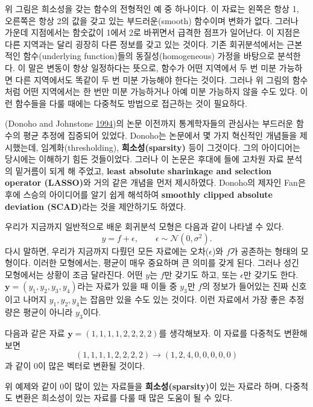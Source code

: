 \documentclass[b5paper,]{book}
\theoremstyle{definition}
\theoremstyle{definition}
\theoremstyle{definition}
\theoremstyle{remark}
\let\BeginKnitrBlock\begin \let\EndKnitrBlock\end
\begin{document}
위 그림은 희소성을 갖는 함수의 전형적인 예 중 하나이다. 이 자료는 왼쪽은
항상 1, 오른쪽은 항상 2의 값을 갖고 있는 부드러운(smooth) 함수이며
변화가 없다. 그러나 가운데 지점에서는 함숫값이 1에서 2로 바뀌면서 급격한
점프가 일어난다. 이 지점은 다른 지역과는 달리 굉장히 다른 정보를 갖고
있는 것이다. 기존 회귀분석에서는 근본적인 함수(underlying function)들의
동질성(homogeneous) 가정을 바탕으로 분석한다. 이 말은 변동이 항상
일정하다는 뜻으로, 함수가 어떤 지역에서 두 번 미분 가능하면 다른
지역에서도 똑같이 두 번 미분 가능해야 한다는 것이다. 그러나 위 그림의
함수처럼 어떤 지역에서는 한 번만 미분 가능하거나 아예 미분 가능하지 않을
수도 있다. 이런 함수들을 다룰 때에는 다중척도 방법으로 접근하는 것이
필요하다.

(Donoho and Johnstone \protect\hyperlink{ref-Donoho1994}{1994})의 논문
이전까지 통계학자들의 관심사는 부드러운 함수의 평균 추정에 집중되어
있었다. Donoho는 논문에서 몇 가지 혁신적인 개념들을 제시했는데,
임계화(thresholding), \textbf{희소성(sparsity)} 등이 그것이다. 그의
아이디어는 당시에는 이해하기 힘든 것들이었다. 그러나 이 논문은 후대에
들에 고차원 자료 분석의 밑거름이 되게 해 주었고, \textbf{least absolute
sharinkage and selection operator (LASSO)}와 거의 같은 개념을 먼저
제시하였다. Donoho의 제자인 Fan은 후에 스승의 아이디어를 알기 쉽게
해석하여 \textbf{smoothly clipped absolute deviation (SCAD)}라는 것을
제안하기도 하였다.

우리가 지금까지 일반적으로 배운 회귀분석 모형은 다음과 같이 나타낼 수
있다. \[y=f+\epsilon, \qquad{\epsilon \sim \mathcal{N}(0,\sigma^{2}).}\]
다시 말하면, 우리가 지금까지 다뤘던 모든 자료에는 오차(\(\epsilon\))와
\(f\)가 공존하는 형태의 모형이다. 이러한 모형에서는, 평균이 매우
중요하며 큰 의미를 갖게 된다. 그러나 성긴 모형에서는 상황이 조금
달라진다. 어떤 \(y\)는 \(f\)만 갖기도 하고, 또는 \(\epsilon\)만 갖기도
한다. \(\mathbf{y}=(y_{1},y_{2},y_{3},y_{4})\)라는 자료가 있을 때 이들
중 \(y_{3}\)만 \(f\)의 정보가 들어있는 진짜 신호이고 나머지
\(y_{1},y_{2},y_{4}\)는 잡음만 있을 수도 있는 것이다. 이런 자료에서 가장
좋은 추정량은 평균이 아니라 \(y_{3}\)이다.

\BeginKnitrBlock{theorem}[다중척도 변환의 희소성]
\protect\hypertarget{thm:unnamed-chunk-103}{}{\label{thm:unnamed-chunk-103}
{} } 다음과 같은 자료
\(\mathbf{y}=(1,1,1,1,2,2,2,2)\)를 생각해보자. 이 자료를 다중척도 변환해
보면 \[(1,1,1,1,2,2,2,2) \rightarrow (1,2,4,0,0,0,0,0)\] 과 같이 0이
많은 벡터로 변환될 것이다.
\EndKnitrBlock{theorem}

위 예제와 같이 0이 많이 있는 자료들을 \textbf{희소성(sparsity)}이 있는
자료라 하며, 다중척도 변환은 희소성이 있는 자료를 다룰 때 많은 도움이 될
수 있다.
\end{document}
